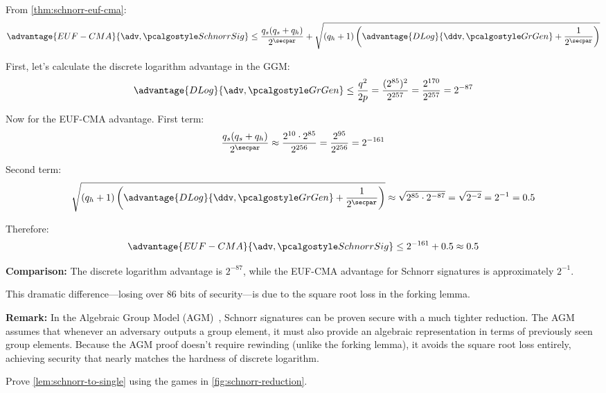 \ifsolutions
\begin{mysolution}
  From \autoref{thm:schnorr-euf-cma}:
  \[
    \advantage{EUF-CMA}{\adv, \algo{SchnorrSig}} \leq \frac{q_s(q_s + q_h)}{2^\secpar} + \sqrt{(q_h + 1) \left(\advantage{DLog}{\ddv, \grgen} + \frac{1}{2^\secpar}\right)}
  \]
  
  First, let's calculate the discrete logarithm advantage in the GGM:
  \[
    \advantage{DLog}{\adv, \grgen} \leq \frac{q^2}{2p} = \frac{(2^{85})^2}{2^{257}} = \frac{2^{170}}{2^{257}} = 2^{-87}
  \]
  
  Now for the EUF-CMA advantage. First term:
  \[
    \frac{q_s(q_s + q_h)}{2^\secpar} \approx \frac{2^{10} \cdot 2^{85}}{2^{256}} = \frac{2^{95}}{2^{256}} = 2^{-161}
  \]
  
  Second term:
  \[
    \sqrt{(q_h + 1) \left(\advantage{DLog}{\ddv, \grgen} + \frac{1}{2^\secpar}\right)} \approx \sqrt{2^{85} \cdot 2^{-87}} = \sqrt{2^{-2}} = 2^{-1} = 0.5
  \]
  
  Therefore:
  \[
    \advantage{EUF-CMA}{\adv, \algo{SchnorrSig}} \leq 2^{-161} + 0.5 \approx 0.5
  \]
  
  \textbf{Comparison:} The discrete logarithm advantage is $2^{-87}$, while the EUF-CMA advantage for Schnorr signatures is approximately $2^{-1}$.
  
  This dramatic difference—losing over 86 bits of security—is due to the square root loss in the forking lemma. 
  
  \textbf{Remark:} In the Algebraic Group Model (AGM)~\cite{C:FucKilLos18}, Schnorr signatures can be proven secure with a much tighter reduction. The AGM assumes that whenever an adversary outputs a group element, it must also provide an algebraic representation in terms of previously seen group elements. Because the AGM proof doesn't require rewinding (unlike the forking lemma), it avoids the square root loss entirely, achieving security that nearly matches the hardness of discrete logarithm.
\end{mysolution}
\fi

\begin{exercise}\label{ex:schnorr-to-single}
  Prove \autoref{lem:schnorr-to-single} using the games in \autoref{fig:schnorr-reduction}.
\end{exercise}


